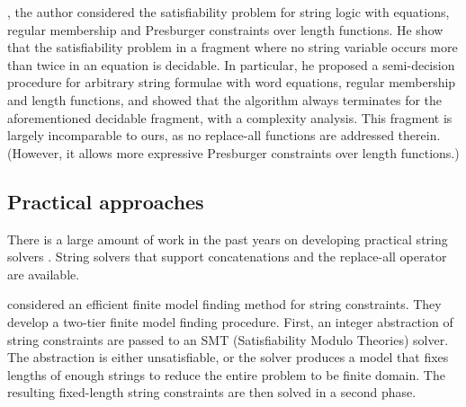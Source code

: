 \cite{L16}, the author considered the satisfiability problem for string logic with equations, regular membership and Presburger constraints over length functions. %
He show that the satisfiability problem in a fragment where no string variable occurs more than twice in an equation is decidable. In particular, he proposed a semi-decision procedure for arbitrary string formulae with word equations, regular membership and length functions, and showed that the algorithm always terminates for the aforementioned decidable fragment, with a complexity analysis. 
This fragment is largely incomparable to ours, as no replace-all functions are addressed therein. (However, it allows more expressive Presburger constraints over length functions.)


\subsection*{Practical approaches}

There is a large amount of work in the past years on developing practical string solvers
. String solvers that support concatenations and the replace-all operator are available. \cite{BTV09, TCJ14, YABI14,TCJ16}

\cite{BTV09} considered an efficient finite model finding method for string constraints. They develop a two-tier finite model finding procedure. First, an integer abstraction of string constraints are passed to an SMT (Satisfiability Modulo Theories) solver. The abstraction is either unsatisfiable, or the solver produces a model that fixes lengths of enough strings to reduce the entire problem to be finite domain. The resulting fixed-length string constraints are then solved in a second phase. 



